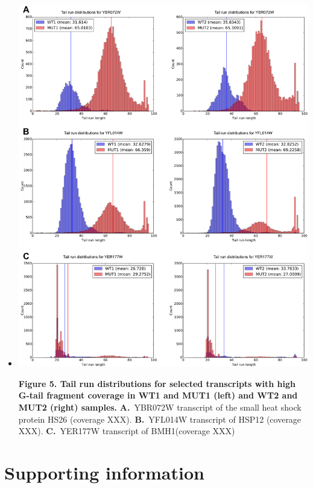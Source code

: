 \documentclass[10pt]{article}
\begin{document}
\begin{itemize}
\item[]{
\includegraphics[scale=0.8]{Figure5.png}

\textbf{Figure 5. Tail run distributions for selected transcripts with high G-tail fragment coverage in WT1 and MUT1 (left) and WT2 and MUT2 (right) samples.} \textbf{A.}~YBR072W transcript of the small heat shock protein HS26 (coverage XXX). \textbf{B.}~YFL014W transcript of HSP12 (coverage XXX). \textbf{C.}~YER177W transcript of BMH1(coverage XXX)
}

\end{itemize}

\section*{Supporting information}
\end{document}
